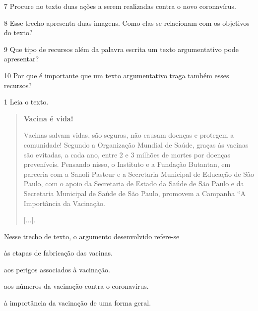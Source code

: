 \num{7} Procure no texto duas ações a serem realizadas contra o novo
coronavírus.



\num{8} Esse trecho apresenta duas imagens. Como elas se
relacionam com os objetivos do texto?



\num{9} Que tipo de recursos além da palavra escrita um texto argumentativo
pode apresentar?



\num{10} Por que é importante que um texto argumentativo traga também esses recursos?




\num{1} Leia o texto.

\begin{quote}
\textbf{Vacina é vida!}

Vacinas salvam vidas, são seguras, não causam doenças e protegem a
comunidade! Segundo a Organização Mundial de Saúde, graças às vacinas
são evitadas, a cada ano, entre 2 e 3 milhões de mortes por doenças
preveníveis. Pensando nisso, o Instituto e a Fundação Butantan, em
parceria com a Sanofi Pasteur e a Secretaria Municipal de Educação de
São Paulo, com o apoio da Secretaria de Estado da Saúde de São Paulo e
da Secretaria Municipal de Saúde de São Paulo, promovem a Campanha ``A
Importância da Vacinação.

{[}...{]}.

\end{quote}

Nesse trecho de texto, o argumento desenvolvido refere-se

\begin{escolha}
\item às etapas de fabricação das vacinas.

\item aos perigos associados à vacinação.

\item aos números da vacinação contra o coronavírus.

\item à importância da vacinação de uma forma geral.
\end{escolha}

